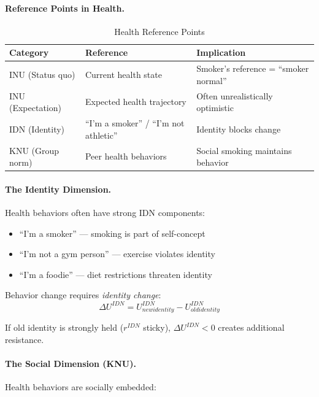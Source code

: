 \paragraph{Reference Points in Health.}

\begin{table}[htbp]
\centering
\caption{Health Reference Points}
\label{tab:health-reference}
\renewcommand{\arraystretch}{1.3}
\begin{tabular}{@{}llp{5.5cm}@{}}
\toprule
\textbf{Category} & \textbf{Reference} & \textbf{Implication} \\
\midrule
INU (Status quo) & Current health state & Smoker's reference = ``smoker normal'' \\
INU (Expectation) & Expected health trajectory & Often unrealistically optimistic \\
IDN (Identity) & ``I'm a smoker'' / ``I'm not athletic'' & Identity blocks change \\
KNU (Group norm) & Peer health behaviors & Social smoking maintains behavior \\
\bottomrule
\end{tabular}
\end{table}

\paragraph{The Identity Dimension.}
Health behaviors often have strong IDN components:

\begin{itemize}
\item ``I'm a smoker'' --- smoking is part of self-concept
\item ``I'm not a gym person'' --- exercise violates identity
\item ``I'm a foodie'' --- diet restrictions threaten identity
\end{itemize}

Behavior change requires \emph{identity change}:
\begin{equation}
\Delta U^{IDN} = U^{IDN}_{new identity} - U^{IDN}_{old identity}
\end{equation}

If old identity is strongly held ($r^{IDN}$ sticky), $\Delta U^{IDN} < 0$ 
creates additional resistance.

\paragraph{The Social Dimension (KNU).}
Health behaviors are socially embedded:


